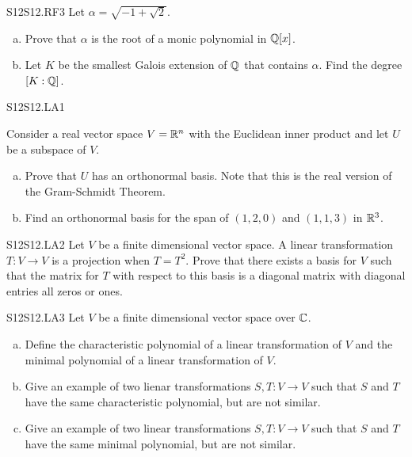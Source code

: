 \documentclass[../AlgebraQualSolutions.tex]{subfiles}
\begin{document}
	\begin{prob}{S12}{S12.RF3}
		Let $\alpha = \sqrt{-1+\sqrt{2}}$.
		\begin{enumerate}[(a)]
			\item Prove that $\alpha$ is the root of a monic polynomial in $\mathbb{Q}[x]$.
			\item Let $K$ be the smallest Galois extension of $\mathbb{Q}$ that contains $\alpha$. Find the degree $[K: \mathbb{Q}]$.
		\end{enumerate}
	\end{prob}

	\begin{prob}{S12}{S12.LA1}

		Consider a real vector space $V = \mathbb{R}^n$ with the Euclidean inner product and let $U$ be a subspace of $V$.

		\begin{enumerate}[(a)]
			\item Prove that $U$ has an orthonormal basis. Note that this is the real version of the Gram-Schmidt Theorem.
			\item Find an orthonormal basis for the span of $(1,2,0)$ and $(1,1,3)$ in $\mathbb{R}^3$.
		\end{enumerate}
	\end{prob}

	\begin{prob}{S12}{S12.LA2}
		Let $V$ be a finite dimensional vector space. A linear transformation $T: V \to V$ is a projection when $T = T^2$. Prove that there exists a basis for $V$ such that the matrix for $T$ with respect to this basis is a diagonal matrix with diagonal entries all zeros or ones.
	\end{prob}

	\begin{prob}{S12}{S12.LA3}
		Let $V$ be a finite dimensional vector space over $\mathbb{C}$.

		\begin{enumerate}[(a)]
			\item Define the characteristic polynomial of a linear transformation of $V$ and the minimal polynomial of a linear transformation of $V$.
			\item Give an example of two lienar transformations $S,T: V \to V$ such that $S$ and $T$ have the same characteristic polynomial, but are not similar.
			\item Give an example of two linear transformations $S,T: V \to V$ such that $S$ and $T$ have the same minimal polynomial, but are not similar.
		\end{enumerate}
	\end{prob}
\end{document}
